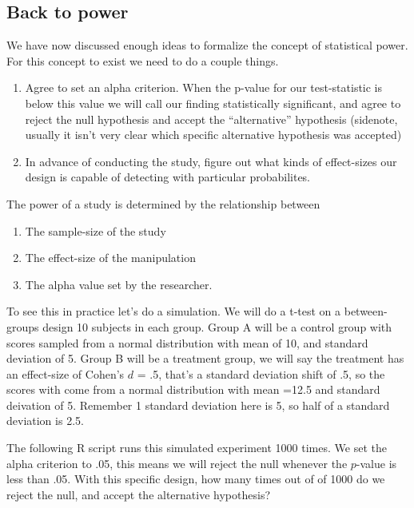 \documentclass[
  letterpaper,
  DIV=11,
  numbers=noendperiod]{scrreprt}
\providecommand{\tightlist}{%
  \setlength{\itemsep}{0pt}\setlength{\parskip}{0pt}}
\begin{document}
\subsection{Back to power}\label{back-to-power}

We have now discussed enough ideas to formalize the concept of
statistical power. For this concept to exist we need to do a couple
things.

\begin{enumerate}
\def\labelenumi{\arabic{enumi}.}
\tightlist
\item
  Agree to set an alpha criterion. When the p-value for our
  test-statistic is below this value we will call our finding
  statistically significant, and agree to reject the null hypothesis and
  accept the ``alternative'' hypothesis (sidenote, usually it isn't very
  clear which specific alternative hypothesis was accepted)
\item
  In advance of conducting the study, figure out what kinds of
  effect-sizes our design is capable of detecting with particular
  probabilites.
\end{enumerate}

The power of a study is determined by the relationship between

\begin{enumerate}
\def\labelenumi{\arabic{enumi}.}
\tightlist
\item
  The sample-size of the study
\item
  The effect-size of the manipulation
\item
  The alpha value set by the researcher.
\end{enumerate}

To see this in practice let's do a simulation. We will do a t-test on a
between-groups design 10 subjects in each group. Group A will be a
control group with scores sampled from a normal distribution with mean
of 10, and standard deviation of 5. Group B will be a treatment group,
we will say the treatment has an effect-size of Cohen's \(d\) = .5,
that's a standard deviation shift of .5, so the scores with come from a
normal distribution with mean =12.5 and standard deivation of 5.
Remember 1 standard deviation here is 5, so half of a standard deviation
is 2.5.

The following R script runs this simulated experiment 1000 times. We set
the alpha criterion to .05, this means we will reject the null whenever
the \(p\)-value is less than .05. With this specific design, how many
times out of of 1000 do we reject the null, and accept the alternative
hypothesis?
\end{document}
